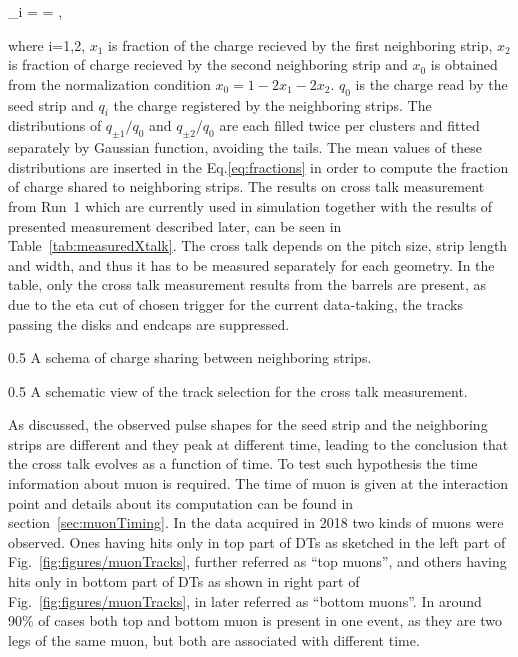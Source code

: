 {
\eta_{\pm i} =  =  ,
}

where i=1,2, $x_{1}$ is fraction of the charge recieved by the first neighboring strip,  $x_{2}$ is fraction of charge recieved by the second neighboring strip and $x_{0}$ is obtained from the normalization condition $x_{0} = 1-2x_{1}-2x_{2}$. $q_{0}$ is the charge read by the seed strip and $q_{i}$ the charge registered by the neighboring strips. The distributions of $q_{\pm 1}/q_{0}$ and $q_{\pm 2}/q_{0}$ are each filled twice per clusters and fitted separately by Gaussian function, avoiding the tails. The mean values of these distributions are inserted in the Eq.\ref{eq:fractions} in order to compute the fraction of charge shared to neighboring strips. The results on cross talk measurement from Run~1 which are currently used in simulation together with the results of presented measurement described later, can be seen in Table~\ref{tab:measuredXtalk}. The cross talk depends on the pitch size, strip length and width, and thus it has to be measured separately for each geometry. In the table, only the cross talk measurement results from the barrels are present, as due to the eta cut of chosen trigger for the current data-taking, the tracks passing the disks and endcaps are suppressed. 

                 {0.5}       %
                 { A schema of charge sharing between neighboring strips. }

                 {0.5}       %
                 { A schematic view of the track selection for the cross talk measurement. }


As discussed, the observed pulse shapes for the seed strip and the neighboring strips are different and they peak at different time, leading to the conclusion that the cross talk evolves as a function of time. To test such hypothesis the time information about muon is required. The time of muon is given at the interaction point and details about its computation can be found in section~\ref{sec:muonTiming}. In the data acquired in 2018 two kinds of muons were observed. Ones having hits only in top part of DTs as sketched in the left part of Fig.~\ref{fig:figures/muonTracks}, further referred as ``top muons'',  and others having hits only in bottom part of DTs as shown in right part of Fig.~\ref{fig:figures/muonTracks}, in later referred as ``bottom muons''. In around 90\% of cases both top and bottom muon is present in one event, as they are two legs of the same muon, but both are associated with different time. 

